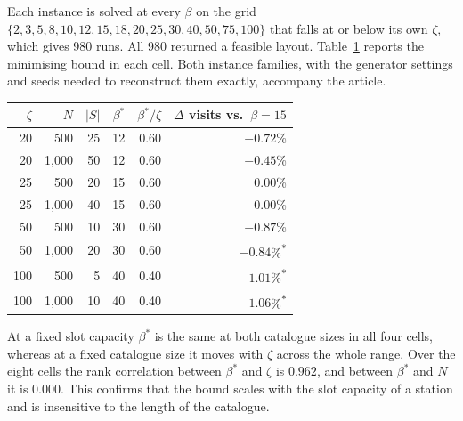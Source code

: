 \documentclass[]{interact}
\begin{document}
Each instance is solved at every $\beta$ on the grid $\{2,3,5,8,10,12,15,18,20,25,30,40,50,75,100\}$ that falls at or below its own $\zeta$, which gives 980 runs. All 980 returned a feasible layout. Table~\ref{tab:capsweep} reports the minimising bound in each cell. Both instance families, with the generator settings and seeds needed to reconstruct them exactly, accompany the article.

\begin{table}[H]
\centering
{}
{\small\begin{tabular*}{\textwidth}{@{\extracolsep{\fill}}rrrrrr@{}}
\toprule
$\zeta$ & $N$ & $|S|$ & $\beta^\ast$ & $\beta^\ast/\zeta$ & $\Delta$ visits vs.\ $\beta=15$ \\
\midrule
20  & 500   & 25 & 12 & 0.60 & $-0.72$\% \\
20  & 1{,}000 & 50 & 12 & 0.60 & $-0.45$\% \\
25  & 500   & 20 & 15 & 0.60 & $0.00$\% \\
25  & 1{,}000 & 40 & 15 & 0.60 & $0.00$\% \\
50  & 500   & 10 & 30 & 0.60 & $-0.87$\% \\
50  & 1{,}000 & 20 & 30 & 0.60 & $-0.84$\%\textsuperscript{$\ast$} \\
100 & 500   & 5  & 40 & 0.40 & $-1.01$\%\textsuperscript{$\ast$} \\
100 & 1{,}000 & 10 & 40 & 0.40 & $-1.06$\%\textsuperscript{$\ast$} \\
\bottomrule
\end{tabular*}}
\label{tab:capsweep}
\end{table}

At a fixed slot capacity $\beta^\ast$ is the same at both catalogue sizes in all four cells, whereas at a fixed catalogue size it moves with $\zeta$ across the whole range. Over the eight cells the rank correlation between $\beta^\ast$ and $\zeta$ is $0.962$, and between $\beta^\ast$ and $N$ it is $0.000$. This confirms that the bound scales with the slot capacity of a station and is insensitive to the length of the catalogue.
\end{document}
